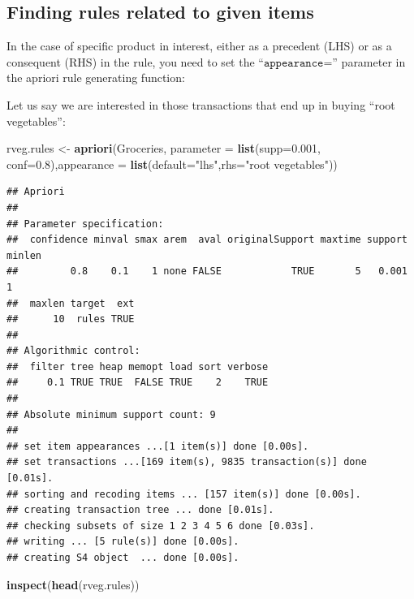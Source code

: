 \documentclass[
]{book}
\newenvironment{Shaded}{\begin{snugshade}}{\end{snugshade}}
\newcommand{\DataTypeTok}[1]{\textcolor[rgb]{0.13,0.29,0.53}{#1}}
\newcommand{\FloatTok}[1]{\textcolor[rgb]{0.00,0.00,0.81}{#1}}
\newcommand{\KeywordTok}[1]{\textcolor[rgb]{0.13,0.29,0.53}{\textbf{#1}}}
\newcommand{\NormalTok}[1]{#1}
\newcommand{\StringTok}[1]{\textcolor[rgb]{0.31,0.60,0.02}{#1}}
\begin{document}
\hypertarget{finding-rules-related-to-given-items}{%
\subsection{Finding rules related to given items}\label{finding-rules-related-to-given-items}}

In the case of specific product in interest, either as a precedent (LHS) or as a consequent (RHS) in the rule, you need to set the ``\(\texttt{appearance=}\)'' parameter in the apriori rule generating function:

Let us say we are interested in those transactions that end up in buying ``root vegetables'':

\begin{Shaded}
\begin{Highlighting}[]
\NormalTok{rveg.rules <-}\StringTok{ }\KeywordTok{apriori}\NormalTok{(Groceries, }\DataTypeTok{parameter =} \KeywordTok{list}\NormalTok{(}\DataTypeTok{supp=}\FloatTok{0.001}\NormalTok{, }\DataTypeTok{conf=}\FloatTok{0.8}\NormalTok{),}\DataTypeTok{appearance =} \KeywordTok{list}\NormalTok{(}\DataTypeTok{default=}\StringTok{"lhs"}\NormalTok{,}\DataTypeTok{rhs=}\StringTok{"root vegetables"}\NormalTok{))}
\end{Highlighting}
\end{Shaded}

\begin{verbatim}
## Apriori
## 
## Parameter specification:
##  confidence minval smax arem  aval originalSupport maxtime support minlen
##         0.8    0.1    1 none FALSE            TRUE       5   0.001      1
##  maxlen target  ext
##      10  rules TRUE
## 
## Algorithmic control:
##  filter tree heap memopt load sort verbose
##     0.1 TRUE TRUE  FALSE TRUE    2    TRUE
## 
## Absolute minimum support count: 9 
## 
## set item appearances ...[1 item(s)] done [0.00s].
## set transactions ...[169 item(s), 9835 transaction(s)] done [0.01s].
## sorting and recoding items ... [157 item(s)] done [0.00s].
## creating transaction tree ... done [0.01s].
## checking subsets of size 1 2 3 4 5 6 done [0.03s].
## writing ... [5 rule(s)] done [0.00s].
## creating S4 object  ... done [0.00s].
\end{verbatim}

\begin{Shaded}
\begin{Highlighting}[]
\KeywordTok{inspect}\NormalTok{(}\KeywordTok{head}\NormalTok{(rveg.rules))}
\end{Highlighting}
\end{Shaded}
\end{document}
